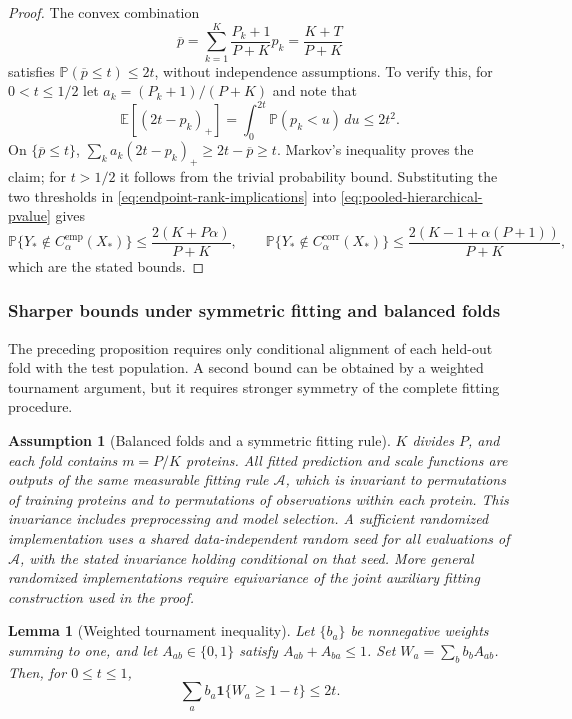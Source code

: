 \documentclass[11pt]{article}
\newtheorem{assumption}{Assumption}
\newtheorem{lemma}{Lemma}
\begin{document}
\begin{proof}
The convex combination
\begin{equation}
 \overline p=\sum_{k=1}^K\frac{P_k+1}{P+K}p_k
 =\frac{K+T}{P+K}
 \label{eq:pooled-hierarchical-pvalue}
\end{equation}
satisfies $\mathbb P(\overline p\leq t)\leq2t$, without independence assumptions. To verify this, for $0<t\leq1/2$ let $a_k=(P_k+1)/(P+K)$ and note that
\[
 \mathbb E[(2t-p_k)_+]
 =\int_0^{2t}\mathbb P(p_k<u)\,du\leq2t^2.
\]
On $\{\overline p\leq t\}$,
$\sum_ka_k(2t-p_k)_+\geq2t-\overline p\geq t$.
Markov's inequality proves the claim; for $t>1/2$ it follows from the trivial probability bound. Substituting the two thresholds in \eqref{eq:endpoint-rank-implications} into \eqref{eq:pooled-hierarchical-pvalue} gives
\[
 \mathbb P\{Y_*\notin C_{\alpha}^{\mathrm{emp}}(X_*)\}
 \leq\frac{2(K+P\alpha)}{P+K},\qquad
 \mathbb P\{Y_*\notin C_{\alpha}^{\mathrm{corr}}(X_*)\}
 \leq\frac{2(K-1+\alpha(P+1))}{P+K},
\]
which are the stated bounds.
\end{proof}

\subsubsection{Sharper bounds under symmetric fitting and balanced folds}

The preceding proposition requires only conditional alignment of each held-out fold with the test population. A second bound can be obtained by a weighted tournament argument, but it requires stronger symmetry of the complete fitting procedure.

\begin{assumption}[Balanced folds and a symmetric fitting rule]
\label{ass:symmetric-fitting}
$K$ divides $P$, and each fold contains $m=P/K$ proteins. All fitted prediction and scale functions are outputs of the same measurable fitting rule $\mathcal A$, which is invariant to permutations of training proteins and to permutations of observations within each protein. This invariance includes preprocessing and model selection. A sufficient randomized implementation uses a shared data-independent random seed for all evaluations of $\mathcal A$, with the stated invariance holding conditional on that seed. More general randomized implementations require equivariance of the joint auxiliary fitting construction used in the proof.
\end{assumption}

\begin{lemma}[Weighted tournament inequality]
\label{lem:weighted-tournament}
Let $\{b_a\}$ be nonnegative weights summing to one, and let $A_{ab}\in\{0,1\}$ satisfy $A_{ab}+A_{ba}\leq1$. Set $W_a=\sum_bb_bA_{ab}$. Then, for $0\leq t\leq1$,
\begin{equation}
 \sum_ab_a\mathbf1\{W_a\geq1-t\}\leq2t.
 \label{eq:weighted-tournament}
\end{equation}
\end{lemma}
\end{document}
